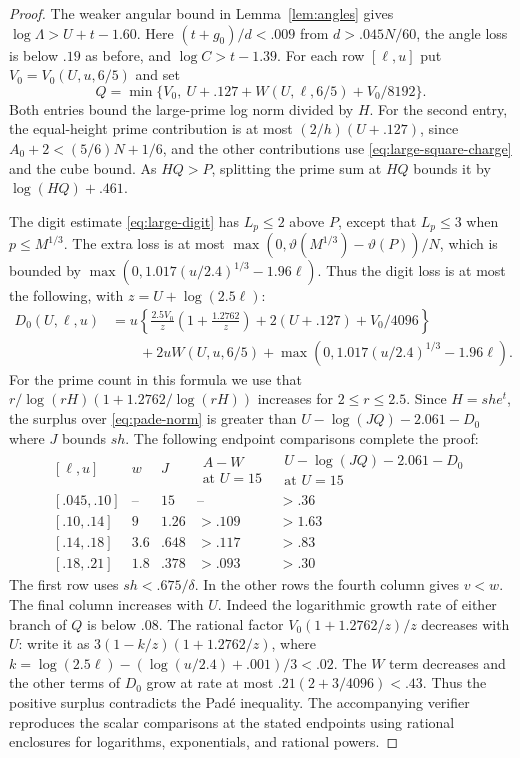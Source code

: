 \begin{proof}
The weaker angular bound in Lemma~\ref{lem:angles} gives
\(\log\Lambda>U+t-1.60\). Here \((t+g_0)/d<.009\)
from \(d>.045N/60\), the angle loss is below \(.19\)
as before, and \(\log C>t-1.39\).
For each row \([\ell,u]\) put \(V_0=V_0(U,u,6/5)\) and set
\[
 Q=\min\{V_0,\ U+.127+W(U,\ell,6/5)+V_0/8192\}.
\]
Both entries bound the large-prime log norm divided by \(H\).
For the second entry, the equal-height prime contribution
is at most \((2/h)(U+.127)\), since
\(A_0+2<(5/6)N+1/6\), and the other contributions use
\eqref{eq:large-square-charge} and the cube bound.
As \(HQ>P\), splitting the prime sum at \(HQ\) bounds it
by \(\log(HQ)+.461\).

The digit estimate \eqref{eq:large-digit} has \(L_p\le2\)
above \(P\), except that \(L_p\le3\) when \(p\le M^{1/3}\).
The extra loss is at most
\(\max(0,\vartheta(M^{1/3})-\vartheta(P))/N\), which is
bounded by \(\max(0,1.017(u/2.4)^{1/3}-1.96\ell)\).
Thus the digit loss is at most the following, with
\(z=U+\log(2.5\ell)\):
\[
\begin{aligned}
 D_0(U,\ell,u)
  &=u\left\{\frac{2.5V_0}{z}\left(1+\frac{1.2762}{z}\right)
                       +2(U+.127)+V_0/4096\right\}\\
  &\qquad+2uW(U,u,6/5)+\max(0,1.017(u/2.4)^{1/3}-1.96\ell).
\end{aligned}
\]
For the prime count in this formula we use that
\(r/\log(rH)(1+1.2762/\log(rH))\) increases for
\(2\le r\le2.5\). Since \(H=she^t\), the surplus over
\eqref{eq:pade-norm} is greater than
\(U-\log(JQ)-2.061-D_0\) where \(J\) bounds \(sh\).
The following endpoint comparisons complete the proof:
\[
\begin{array}{c|c|r|c|c}
{}[\ell,u]&w&J&
\substack{A-W\\\text{at }U=15}&
\substack{U-\log(JQ)-2.061-D_0\\ \text{at }U=15}\\ \hline
{}[.045,.10]&\text{--}&15&\text{--}&>.36\\
{}[.10,.14]&9&1.26&>.109&>1.63\\
{}[.14,.18]&3.6&.648&>.117&>.83\\
{}[.18,.21]&1.8&.378&>.093&>.30
\end{array}
\]
The first row uses \(sh<.675/\delta\). In the other rows
the fourth column gives \(v<w\). The final column
increases with \(U\). Indeed the logarithmic growth rate of
either branch of \(Q\) is below \(.08\).
The rational factor \(V_0(1+1.2762/z)/z\) decreases with \(U\):
write it as \(3(1-k/z)(1+1.2762/z)\), where
\(k=\log(2.5\ell)-(\log(u/2.4)+.001)/3<.02\).
The \(W\) term decreases and the other terms of \(D_0\)
grow at rate at most \(.21(2+3/4096)<.43\).
Thus the positive surplus contradicts the Padé inequality.
The accompanying verifier reproduces the scalar comparisons
at the stated endpoints using rational enclosures for logarithms,
exponentials, and rational powers.
\end{proof}

